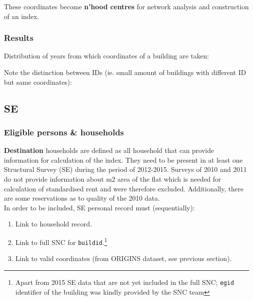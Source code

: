 \documentclass[a4paper, notitlepage, fleqn]{article} %
\begin{document}
These coordinates become \textbf{n'hood centres} for network analysis and construction of an index.  

\subsubsection{Results}

Distribution of years from which coordinates of a building are taken: 
\begin{stlog}\end{stlog}
Note the distinction between IDs (ie. small amount of buildings with different ID but same coordinates):
\begin{stlog}\end{stlog}
\newpage
\subsection{SE}

\subsubsection{Eligible persons \& households}

\textbf{Destination} households are defined as all household that can provide information for calculation of the index. 
They need to be present in at least one Structural Survey (SE) during the period of 2012-2015.
Surveys of 2010 and 2011 do not provide information
about m2 area of the flat which is needed for calculation of standardised rent and were therefore excluded. 
Additionally, there are some reservations as to quality of the 2010 data. \\

In order to be included, SE personal record must (sequentially): 

\begin{enumerate}

	\item Link to household record.
	
	\item Link to full SNC for \texttt{buildid}.\footnote{Apart from 2015 SE data that are not yet included in the full SNC; \texttt{egid} identifier of the building was kindly provided by the SNC team}
	
	\item Link to valid coordinates (from ORIGINS dataset, see previous section).

\end{enumerate}
\end{document}
